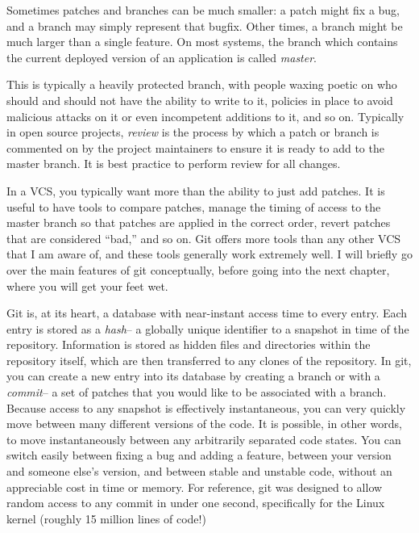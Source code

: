 \par{
Sometimes patches and branches can be much smaller: a patch might fix a bug, and a branch may
simply represent that bugfix. Other times, a branch might be much larger than
a single feature. On most systems, the branch which contains the current
deployed version of an application is called \emph{master}. 

\par{
This is typically
a heavily protected branch, with people waxing poetic on who should and should
not have the ability to write to it, policies in place to avoid malicious
attacks on it or even incompetent additions to it, and so on. Typically in
open source projects, \emph{review} is the process by which a patch or branch
is commented on by the project maintainers to ensure it is ready to add to the
master branch. It is best practice to perform review for all changes.
}

\par{
In a VCS, you typically want more than the ability to just add patches. It is
useful to have tools to compare patches, manage the timing of access to the
master branch so that patches are applied in the correct order, revert patches
that are considered ``bad,'' and so on. Git offers more tools than any other
VCS that I am aware of, and these tools generally work extremely well. I will
briefly go over the main features of git conceptually, before going into the
next chapter, where you will get your feet wet.
}

\par{
Git is, at its heart, a database with near-instant access time to every entry.
Each entry is stored as a \emph{hash}-- a globally unique identifier to a
snapshot in time of the repository. Information is stored as hidden files and
directories within the repository itself, which are then transferred to any
clones of the repository. In git, you can create a new entry into its database
by creating a branch or with a \emph{commit}-- a set of patches that you would
like to be associated with a branch. Because access to any snapshot is
effectively instantaneous, you can very quickly move between many different
versions of the code. It is possible, in other words, to move instantaneously
between any arbitrarily separated code states. You can switch easily between
fixing a bug and adding a feature, between your version and someone else's
version, and between stable and unstable code, without an appreciable cost in
time or memory. For reference, git was designed to allow random access to any
commit in under one second, specifically for the Linux kernel (roughly 15
million lines of code!)
}

}
